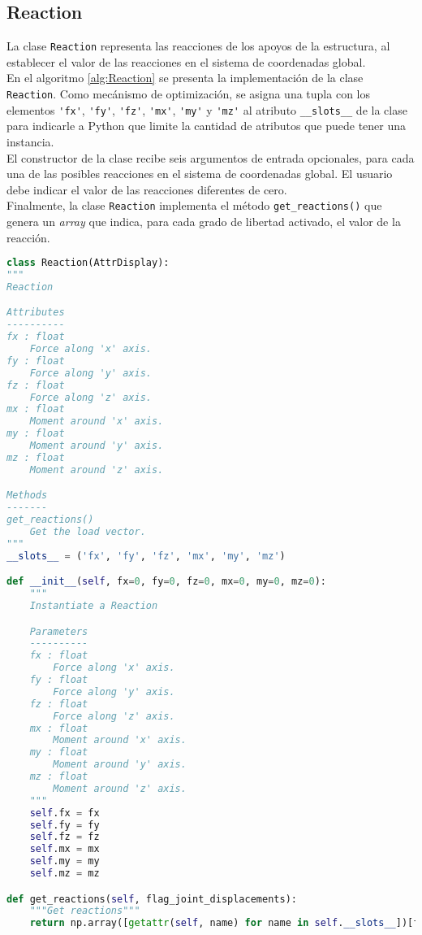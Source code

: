 \subsection{Reaction}

La clase \verb|Reaction| representa las reacciones de los apoyos de la estructura, al establecer el valor de las reacciones en el sistema de coordenadas global.\\

En el algoritmo \ref{alg:Reaction} se presenta la implementación de la clase \verb|Reaction|. Como mecánismo de optimización, se asigna una tupla con los elementos \verb|'fx'|, \verb|'fy'|, \verb|'fz'|, \verb|'mx'|, \verb|'my'| y \verb|'mz'| al atributo \verb|__slots__| de la clase para indicarle a Python que limite la cantidad de atributos que puede tener una instancia.\\

El constructor de la clase recibe seis argumentos de entrada opcionales, para cada una de las posibles reacciones en el sistema de coordenadas global. El usuario debe indicar el valor de las reacciones diferentes de cero.\\

Finalmente, la clase \verb|Reaction| implementa el método \verb|get_reactions()| que genera un \emph{array} que indica, para cada grado de libertad activado, el valor de la reacción.\\

\begin{lstlisting}[language=Python,caption=Clase \texttt{Reaction} implementada en el archivo \texttt{primitives.py}.,label=alg:Reaction, frame=single]
class Reaction(AttrDisplay):
"""
Reaction

Attributes
----------
fx : float
    Force along 'x' axis.
fy : float
    Force along 'y' axis.
fz : float
    Force along 'z' axis.
mx : float
    Moment around 'x' axis.
my : float
    Moment around 'y' axis.
mz : float
    Moment around 'z' axis.

Methods
-------
get_reactions()
    Get the load vector.
"""
__slots__ = ('fx', 'fy', 'fz', 'mx', 'my', 'mz')

def __init__(self, fx=0, fy=0, fz=0, mx=0, my=0, mz=0):
    """
    Instantiate a Reaction

    Parameters
    ----------
    fx : float
        Force along 'x' axis.
    fy : float
        Force along 'y' axis.
    fz : float
        Force along 'z' axis.
    mx : float
        Moment around 'x' axis.
    my : float
        Moment around 'y' axis.
    mz : float
        Moment around 'z' axis.
    """
    self.fx = fx
    self.fy = fy
    self.fz = fz
    self.mx = mx
    self.my = my
    self.mz = mz

def get_reactions(self, flag_joint_displacements):
    """Get reactions"""
    return np.array([getattr(self, name) for name in self.__slots__])[flag_joint_displacements]
\end{lstlisting}

